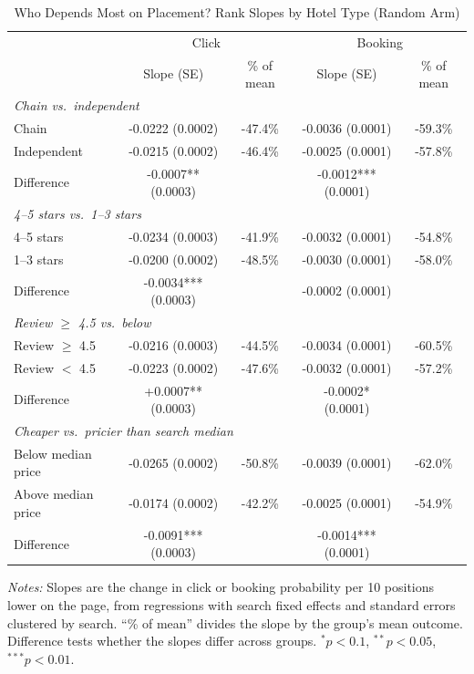 \begin{table}[htbp]\centering
\caption{Who Depends Most on Placement? Rank Slopes by Hotel Type (Random Arm)}
\label{tab:heterogeneity}
\begin{tabular}{lcccc}
\toprule
 & \multicolumn{2}{c}{Click} & \multicolumn{2}{c}{Booking} \\
 & Slope (SE) & \% of mean & Slope (SE) & \% of mean \\
\midrule
\multicolumn{5}{l}{\textit{Chain vs.\ independent}} \\
Chain & -0.0222 (0.0002) & -47.4\% & -0.0036 (0.0001) & -59.3\% \\
Independent & -0.0215 (0.0002) & -46.4\% & -0.0025 (0.0001) & -57.8\% \\
Difference & -0.0007** (0.0003) &  & -0.0012*** (0.0001) &  \\[0.4em]
\multicolumn{5}{l}{\textit{4--5 stars vs.\ 1--3 stars}} \\
4--5 stars & -0.0234 (0.0003) & -41.9\% & -0.0032 (0.0001) & -54.8\% \\
1--3 stars & -0.0200 (0.0002) & -48.5\% & -0.0030 (0.0001) & -58.0\% \\
Difference & -0.0034*** (0.0003) &  & -0.0002 (0.0001) &  \\[0.4em]
\multicolumn{5}{l}{\textit{Review $\geq$ 4.5 vs.\ below}} \\
Review $\geq$ 4.5 & -0.0216 (0.0003) & -44.5\% & -0.0034 (0.0001) & -60.5\% \\
Review $<$ 4.5 & -0.0223 (0.0002) & -47.6\% & -0.0032 (0.0001) & -57.2\% \\
Difference & +0.0007** (0.0003) &  & -0.0002* (0.0001) &  \\[0.4em]
\multicolumn{5}{l}{\textit{Cheaper vs.\ pricier than search median}} \\
Below median price & -0.0265 (0.0002) & -50.8\% & -0.0039 (0.0001) & -62.0\% \\
Above median price & -0.0174 (0.0002) & -42.2\% & -0.0025 (0.0001) & -54.9\% \\
Difference & -0.0091*** (0.0003) &  & -0.0014*** (0.0001) &  \\[0.4em]
\bottomrule
\end{tabular}
\begin{minipage}{0.92\textwidth}\footnotesize\vspace{0.3em}
\textit{Notes:} Slopes are the change in click or booking probability per 10 positions lower on the page, from regressions with search fixed effects and standard errors clustered by search. ``\% of mean'' divides the slope by the group's mean outcome. Difference tests whether the slopes differ across groups. $^{*}p<0.1$, $^{**}p<0.05$, $^{***}p<0.01$.
\end{minipage}
\end{table}
